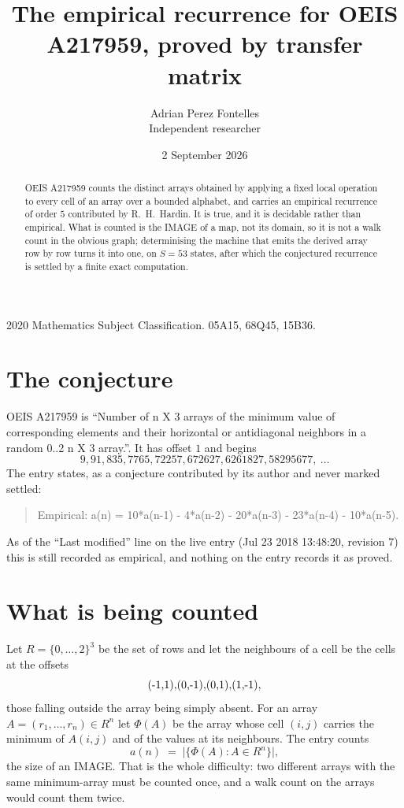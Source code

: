 \documentclass[11pt,a4paper]{article}
\title{The empirical recurrence for OEIS A217959, proved by transfer matrix}
\author{Adrian Perez Fontelles\\ \small Independent researcher}
\date{2 September 2026}
\theoremstyle{plain}
\theoremstyle{definition}
\begin{document}
\maketitle

\begin{abstract}
OEIS A217959 counts the distinct arrays obtained by applying a fixed local operation to every cell
of an array over a bounded alphabet, and carries an empirical recurrence of order $5$
contributed by R.~H.~Hardin. It is true, and it is decidable rather than empirical. What is
counted is the IMAGE of a map, not its domain, so it is not a walk count in the obvious graph;
determinising the machine that emits the derived array row by row turns it into one, on
$S=53$ states, after which the conjectured recurrence is settled by a finite exact
computation.
\end{abstract}

\noindent\small 2020 Mathematics Subject Classification. 05A15, 68Q45, 15B36.\normalsize

\section{The conjecture}

OEIS A217959 is ``Number of n X 3 arrays of the minimum value of corresponding elements and their horizontal or antidiagonal neighbors in a random 0..2 n X 3 array.''. It has offset $1$ and begins
\[
9, 91, 835, 7765, 72257, 672627, 6261827, 58295677,\ \dots
\]
The entry states, as a conjecture contributed by its author and never marked settled:
\begin{quote}
Empirical: a(n) = 10*a(n-1) - 4*a(n-2) - 20*a(n-3) - 23*a(n-4) - 10*a(n-5).
\end{quote}
As of the ``Last modified'' line on the live entry (Jul 23 2018 13:48:20, revision 7) this is still
recorded as empirical, and nothing on the entry records it as proved.

\section{What is being counted}

Let $R=\{0,\dots,2\}^{3}$ be the set of rows and let the neighbours of
a cell be the cells at the offsets
\[
$(-1,1)$, $(0,-1)$, $(0,1)$, $(1,-1)$,
\]
those falling outside the array being simply absent. For an array
$A=(r_1,\dots,r_n)\in R^n$ let $\Phi(A)$ be the array whose cell $(i,j)$ carries the
minimum of $A(i,j)$ and of the values at its neighbours. The entry counts
\[
a(n)\;=\;\bigl|\{\Phi(A):A\in R^n\}\bigr| ,
\]
the size of an IMAGE. That is the whole difficulty: two different arrays with the same
minimum-array must be counted once, and a walk count on the arrays would count them twice.
\end{document}
